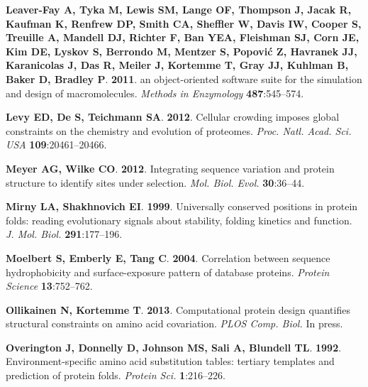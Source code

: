 \documentclass[12pt]{article}
\begin{document}
\begin{thebibliography}{36}
\textbf{Leaver-Fay A, Tyka M, Lewis SM, Lange OF, Thompson J, Jacak R, Kaufman
  K, Renfrew DP, Smith CA, Sheffler W, Davis IW, Cooper S, Treuille A, Mandell
  DJ, Richter F, Ban YEA, Fleishman SJ, Corn JE, Kim DE, Lyskov S, Berrondo M,
  Mentzer S, Popovi\'c Z, Havranek JJ, Karanicolas J, Das R, Meiler J, Kortemme
  T, Gray JJ, Kuhlman B, Baker D, Bradley P}. \textbf{2011}.
 an object-oriented software suite for the simulation and
  design of macromolecules.
\newblock \emph{Methods in Enzymology} \textbf{487}:545--574.

\textbf{Levy ED, De S, Teichmann SA}. \textbf{2012}.
\newblock Cellular crowding imposes global constraints on the chemistry and
  evolution of proteomes.
\newblock \emph{Proc. Natl. Acad. Sci. USA} \textbf{109}:20461--20466.

\textbf{Meyer AG, Wilke CO}. \textbf{2012}.
\newblock Integrating sequence variation and protein structure to identify
  sites under selection.
\newblock \emph{Mol. Biol. Evol.} \textbf{30}:36--44.

\textbf{Mirny LA, Shakhnovich EI}. \textbf{1999}.
\newblock Universally conserved positions in protein folds: reading
  evolutionary signals about stability, folding kinetics and function.
\newblock \emph{J. Mol. Biol.} \textbf{291}:177--196.

\textbf{Moelbert S, Emberly E, Tang C}. \textbf{2004}.
\newblock Correlation between sequence hydrophobicity and surface-exposure
  pattern of database proteins.
\newblock \emph{Protein Science} \textbf{13}:752--762.

\textbf{Ollikainen N, Kortemme T}. \textbf{2013}.
\newblock Computational protein design quantifies structural constraints on
  amino acid covariation.
\newblock \emph{PLOS Comp. Biol.} In press.

\textbf{Overington J, Donnelly D, Johnson MS, Sali A, Blundell TL}.
  \textbf{1992}.
\newblock Environment-specific amino acid substitution tables: tertiary
  templates and prediction of protein folds.
\newblock \emph{Protein Sci.} \textbf{1}:216--226.


\end{thebibliography}
\end{document}
